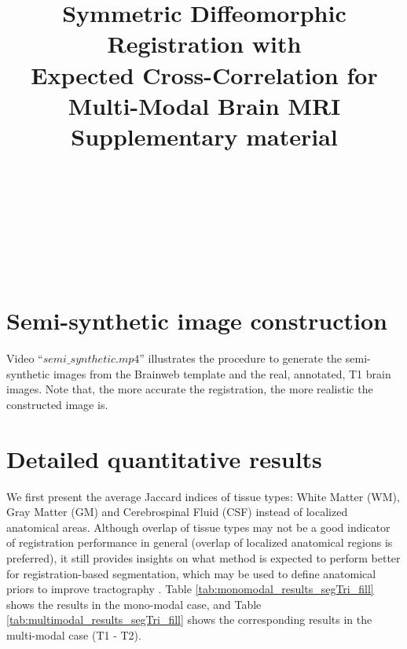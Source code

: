 \documentclass[journal]{IEEEtran}
\begin{document}
\title{\Large Symmetric Diffeomorphic Registration with \\ Expected Cross-Correlation for Multi-Modal Brain MRI\\ {\large Supplementary material}}
\author{
    ~\and~
    ~\and~
    ~\and~
    \\
}

\maketitle
\section{Semi-synthetic image construction}
Video ``$semi\_synthetic.mp4$'' illustrates the procedure to generate the semi-synthetic images from the Brainweb template and the real, annotated, T1 brain images. Note that, the more accurate the registration, the more realistic the constructed image is.\\

\section{Detailed quantitative results}

We first present the average Jaccard indices of tissue types: White Matter (WM), Gray Matter (GM) and Cerebrospinal Fluid (CSF) instead of localized anatomical areas. Although overlap of tissue types may not be a good indicator of registration performance in general \cite{Rohlfing2012} (overlap of localized anatomical regions is preferred), it still provides insights on what method is expected to perform better for registration-based segmentation, which may be used to define anatomical priors to improve tractography \cite{Smith2012, Girard2014}. Table \ref{tab:monomodal_results_segTri_fill} shows the results in the mono-modal case, and Table \ref{tab:multimodal_results_segTri_fill} shows the corresponding results in the multi-modal case (T1 - T2).





\pagebreak
\end{document}
